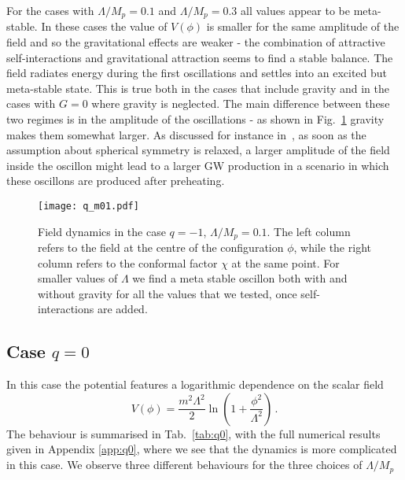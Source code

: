 \documentclass[11pt,a4paper]{article}
\begin{document}
For the cases with $\Lambda/M_p = 0.1$ and $\Lambda/M_p = 0.3$ all values appear to be meta-stable. In these cases the value of $V(\phi)$ is smaller for the same amplitude of the field and so the gravitational effects are weaker - the combination of attractive self-interactions and gravitational attraction seems to find a stable balance. The field radiates energy during the first oscillations and settles into an excited but meta-stable state. This is true both in the cases that include gravity and in the cases with $G = 0$ where gravity is neglected. The main difference between these two regimes is in the amplitude of the oscillations - as shown in Fig.~\ref{fig:qminus01} gravity makes them somewhat larger. As discussed for instance in~\cite{Antusch:2017vga}, as soon as the assumption about spherical symmetry is relaxed, a larger amplitude of the field inside the oscillon might lead to a larger GW production in a scenario in which these oscillons are produced after preheating. 

\begin{figure}[h!]\centering
\texttt{[image: q\_m01.pdf]}
\caption{Field dynamics in the case $q=-1$, $\Lambda/M_p = 0.1$. The left column refers to the field at the centre of the configuration $\phi$, while the right column refers to the conformal factor $\chi$ at the same point. For smaller values of $\Lambda$ we find a meta stable oscillon both with and without gravity for all the values that we tested, once self-interactions are added. \label{fig:qminus01}}
\end{figure}


\subsection{Case $q = 0$}
\label{sec:q0}

In this case the potential features a logarithmic dependence on the scalar field
\begin{equation}
V(\phi)=\frac{m^2 \Lambda^2}{2} \ln \left(1+\frac{ \phi^2}{\Lambda^2}\right) \,.
\end{equation}
The behaviour is summarised in Tab.~\ref{tab:q0}, with the full numerical results given in Appendix \ref{app:q0}, where we see that the dynamics is more complicated in this case. We observe three different behaviours for the three choices of $\Lambda/M_p$
\end{document}
